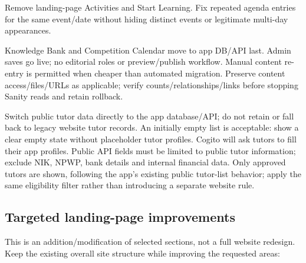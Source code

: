 \documentclass[11pt,a4paper]{article}
\begin{document}
Remove landing-page Activities and Start Learning. Fix repeated agenda entries for the same event/\allowbreak{}date without hiding distinct events or legitimate multi-day appearances.

Knowledge Bank and Competition Calendar move to app DB/\allowbreak{}API last. Admin saves go live; no editorial roles or preview/\allowbreak{}publish workflow. Manual content re-entry is permitted when cheaper than automated migration. Preserve content access/\allowbreak{}files/\allowbreak{}URLs as applicable; verify counts/\allowbreak{}relationships/\allowbreak{}links before stopping Sanity reads and retain rollback.

Switch public tutor data directly to the app database/\allowbreak{}API; do not retain or fall back to legacy website tutor records. An initially empty list is acceptable: show a clear empty state without placeholder tutor profiles. Cogito will ask tutors to fill their app profiles. Public API fields must be limited to public tutor information; exclude NIK, NPWP, bank details and internal financial data. Only approved tutors are shown, following the app's existing public tutor-list behavior; apply the same eligibility filter rather than introducing a separate website rule.

\subsection*{Targeted landing-page improvements}

This is an addition/\allowbreak{}modification of selected sections, not a full website redesign. Keep the existing overall site structure while improving the requested areas:
\end{document}
